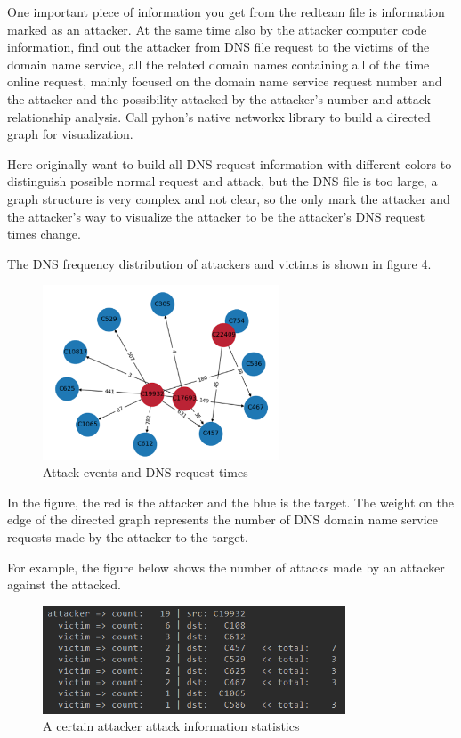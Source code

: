 \documentclass[12pt,journal,draftcls,doublespace, letterpaper,onecolumn]{IEEEtran}
\begin{document}
One important piece of information you get from the redteam file is information marked as an attacker. At the same time also by the attacker computer code information, find out the attacker from DNS file request to the victims of the domain name service, all the related domain names containing all of the time online request, mainly focused on the domain name service request number and the attacker and the possibility attacked by the attacker's number and attack relationship analysis. Call pyhon's native networkx library to build a directed graph for visualization.

Here originally want to build all DNS request information with different colors to distinguish possible normal request and attack, but the DNS file is too large, a graph structure is very complex and not clear, so the only mark the attacker and the attacker's way to visualize the attacker to be the attacker's DNS request times change.

The DNS frequency distribution of attackers and victims is shown in figure 4.

\begin{figure}[htpb]
	\centering
	\includegraphics [width=7cm]{4.png}
	\caption{Attack events and DNS request times}
	\label{fig}
\end{figure}

In the figure, the red is the attacker and the blue is the target. The weight on the edge of the directed graph represents the number of DNS domain name service requests made by the attacker to the target.

For example, the figure below shows the number of attacks made by an attacker against the attacked.

\begin{figure}[htpb]
	\centering
	\includegraphics [width=9cm]{5.png}
	\caption{A certain attacker attack information statistics}
	\label{fig}
\end{figure}
\end{document}
